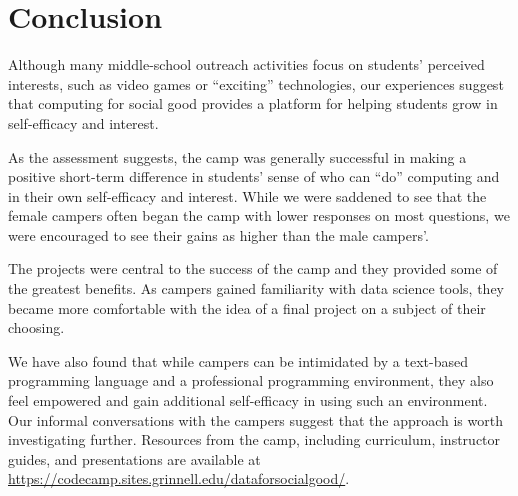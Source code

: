 \section{Conclusion}

Although many middle-school outreach activities focus on students'
perceived interests, such as video games or ``exciting'' technologies,
our experiences suggest that computing for social good
provides a platform for helping students grow in self-efficacy and
interest.

As the assessment suggests, the camp was generally successful in
making a positive short-term difference in students' sense of who
can ``do'' computing and in their own self-efficacy and interest.
While we were saddened to see that the female campers often began
the camp with lower responses on most questions, we were encouraged
to see their gains as higher than the male campers'.

The projects were central to the success of the camp and they
provided some of the greatest benefits.  As campers gained
familiarity with data science tools, they became more comfortable
with the idea of a final project on a subject of their choosing.

We have also found that while campers can be intimidated by a
text-based programming language and a professional programming
environment, they also feel empowered and gain additional self-efficacy
in using such an environment.  Our informal conversations with the
campers suggest that the approach is worth investigating further.
Resources from the camp, including curriculum, instructor guides,
and presentations are available at \url{https://codecamp.sites.grinnell.edu/dataforsocialgood/}.
